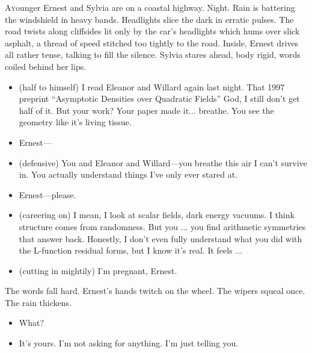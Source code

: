\lettrine{A} younger Ernest and Sylvia are on a coastal highway. Night. Rain is battering the windshield in heavy bands. Headlights slice the dark in erratic pulses. The road twists along cliffsides lit only by the car’s headlights which hums over slick asphalt, a thread of speed stitched too tightly to the road. Inside, Ernest drives all rather tense, talking to fill the silence. Sylvia stares ahead, body rigid, words coiled behind her lips.

\begin{itemize}[leftmargin=2cm, label={}]

\item[\textbf{Ernest:}] (half to himself) 
I read Eleanor and Willard again last night. That 1997 preprint “Asymptotic Densities over Quadratic Fields” God, I still don’t get half of it.  
But your work? Your paper made it... breathe. You see the geometry like it’s living tissue.

\item[\textbf{Sylvia:}]  
Ernest—

\item[\textbf{Ernest :}] (defensive)  
You and Eleanor and Willard—you breathe this air I can’t survive in. You actually understand things I’ve only ever stared at.

\item[\textbf{Sylvia:}]  
Ernest—please.

\item[\textbf{Ernest:}] (careering on) I mean, I look at scalar fields, dark energy vacuums. I think structure comes from randomness. But you ... you find arithmetic symmetries that answer back.  
Honestly, I don’t even fully understand what you did with the L-function residual forms, but I know it’s real. It feels ...

\item[\textbf{Sylvia:}] (cutting in mightily)
I’m pregnant, Ernest.
\end{itemize}

The words fall hard. Ernest’s hands twitch on the wheel. The wipers squeal once. The rain thickens.
\begin{itemize}[leftmargin=2cm, label={}]

\item[\textbf{Ernest:}]  
What?

\item[\textbf{Sylvia:}]  
It’s yours. I’m not asking for anything. I’m just telling you.
\end{itemize}

